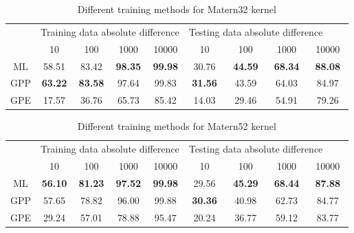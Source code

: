 \documentclass[11pt,a4paper]{article}
\theoremstyle{definition}
\numberwithin{equation}{section}
\begin{document}
	\begin{table}
		\centering
		\begin{tabular}{c|cccc|cccc} 
			\toprule
			& \multicolumn{4}{l|}{Training data absolute difference}              & \multicolumn{4}{l}{Testing data absolute difference~ ~ ~}           \\
			& 10              & 100             & 1000           & 10000          & 10              & 100            & 1000           & 10000           \\ 
			\hline\hline
			ML  & 58.51           & 83.42           & \textbf{98.35} & \textbf{99.98} & 30.76           & \textbf{44.59} & \textbf{68.34} & \textbf{88.08}  \\
			GPP & \textbf{63.22 } & \textbf{83.58 } & 97.64          & 99.83          & \textbf{31.56 } & 43.59          & 64.03          & 84.97           \\
			GPE & 17.57           & 36.76           & 65.73          & 85.42          & 14.03           & 29.46          & 54.91          & 79.26           \\
			\bottomrule
		\end{tabular}
		\caption{Different training methods for Matern32 kernel}
		\label{multitrain_matern32}
	\end{table}
	
	\begin{table}
		\centering
		\begin{tabular}{c|cccc|cccc} 
			\toprule
			& \multicolumn{4}{l|}{Training data absolute difference}            & \multicolumn{4}{l}{Testing data absolute difference~ ~ ~}          \\
			& 10             & 100            & 1000           & 10000          & 10             & 100            & 1000           & 10000           \\ 
			\hline\hline
			ML  & \textbf{56.10} & \textbf{81.23} & \textbf{97.52} & \textbf{99.98} & 29.56          & \textbf{45.29} & \textbf{68.44} & \textbf{87.88}  \\
			GPP & 57.65          & 78.82          & 96.00          & 99.88          & \textbf{30.36} & 40.98          & 62.73          & 84.77           \\
			GPE & 29.24          & 57.01          & 78.88          & 95.47          & 20.24          & 36.77          & 59.12          & 83.77           \\
			\bottomrule
		\end{tabular}
		\caption{Different training methods  for Matern52 kernel}
		\label{multitrain_matern52}
	\end{table}
	
\end{document}
